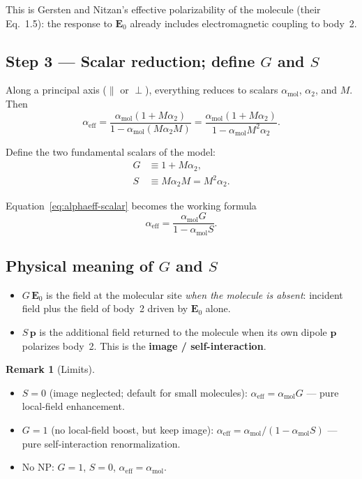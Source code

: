 \documentclass[11pt,a4paper]{article}
\theoremstyle{definition}
\newtheorem{remark}{Remark}[section]
\newcommand{\alpham}{\alpha_{\text{mol}}}
\newcommand{\alphaeff}{\alpha_{\mathrm{eff}}}
\newcommand{\p}{\mathbf{p}}
\begin{document}
\noindent
This is Gersten and Nitzan's effective polarizability of the molecule (their Eq.~1.5): the response to $\mathbf{E}_0$ already includes electromagnetic coupling to body~2.

\subsection{Step 3 --- Scalar reduction; define $G$ and $S$}

\noindent
Along a principal axis ($\parallel$ or $\perp$), everything reduces to scalars $\alpham$, $\alpha_2$, and $M$. Then
\begin{equation}
  \alphaeff
  =
  \frac{\alpham(1+M\alpha_2)}{1-\alpham(M\alpha_2 M)}
  =
  \frac{\alpham(1+M\alpha_2)}{1-\alpham M^2\alpha_2}.
  \label{eq:alphaeff-scalar}
\end{equation}

\noindent
Define the two fundamental scalars of the model:
\begin{align}
  G
  &\equiv
  1 + M\alpha_2,
  \label{eq:G-def}\\[0.3em]
  S
  &\equiv
  M\alpha_2 M
  =
  M^2\alpha_2.
  \label{eq:S-def}
\end{align}

\noindent
Equation~\eqref{eq:alphaeff-scalar} becomes the working formula
\begin{equation}
  \boxed{
    \alphaeff
    =
    \frac{\alpham G}{1-\alpham S}.
  }
  \label{eq:alphaeff-main}
\end{equation}

\subsection{Physical meaning of $G$ and $S$}

\begin{itemize}[leftmargin=1.6em]
  \item $G\,\mathbf{E}_0$ is the field at the molecular site \emph{when the molecule is absent}: incident field plus the field of body~2 driven by $\mathbf{E}_0$ alone. 
  \item $S\,\p$ is the additional field returned to the molecule when its own dipole $\p$ polarizes body~2. This is the \textbf{image / self-interaction}.
\end{itemize}

\begin{remark}[Limits]
\noindent
\begin{itemize}[leftmargin=1.6em]
  \item $S=0$ (image neglected; default for small molecules): $\alphaeff=\alpham G$ --- pure local-field enhancement.
  \item $G=1$ (no local-field boost, but keep image): $\alphaeff=\alpham/(1-\alpham S)$ --- pure self-interaction renormalization.
  \item No NP: $G=1$, $S=0$, $\alphaeff=\alpham$.
\end{itemize}
\end{remark}
\end{document}
